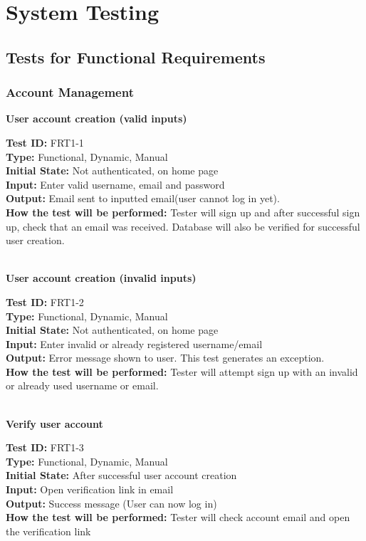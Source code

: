\documentclass[12pt,fleqn]{article}
\begin{document}
\section{System Testing}
\subsection{Tests for Functional Requirements}
\subsubsection{Account Management}

\textbf{User account creation (valid inputs)}
\begin{tcolorbox}
\textbf{Test ID:} FRT1-1\\
\textbf{Type:} Functional, Dynamic, Manual\\
\textbf{Initial State:} Not authenticated, on home page\\
\textbf{Input:} Enter valid username, email and password\\
\textbf{Output:} Email sent to inputted email(user cannot log in yet). \\
\textbf{How the test will be performed:} Tester will sign up and after successful sign up, check that an email was received. Database will also be verified for successful user creation. \\
\end{tcolorbox}

\textbf{\\User account creation (invalid inputs)}
\begin{tcolorbox}
\textbf{Test ID:} FRT1-2\\
\textbf{Type:} Functional, Dynamic, Manual\\
\textbf{Initial State:} Not authenticated, on home page\\
\textbf{Input:} Enter invalid or already registered username/email\\
\textbf{Output:} Error message shown to user.  This test generates an exception.\\
\textbf{How the test will be performed:} Tester will attempt sign up with an invalid or already used username or email. \\
\end{tcolorbox}

\textbf{\\Verify user account}
\begin{tcolorbox}
\textbf{Test ID:} FRT1-3\\
\textbf{Type:} Functional, Dynamic, Manual\\
\textbf{Initial State:} After successful user account creation\\
\textbf{Input:} Open verification link in email \\
\textbf{Output:} Success message (User can now log in) \\
\textbf{How the test will be performed:} Tester will check account email and open the verification link \\
\end{tcolorbox}
\end{document}
